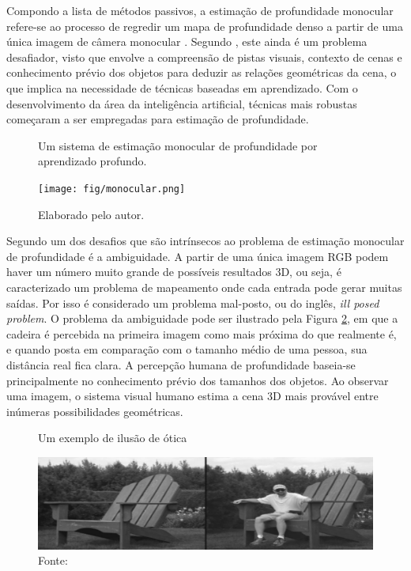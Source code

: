 Compondo a lista de métodos passivos, a estimação de profundidade monocular refere-se ao processo de regredir um mapa de profundidade denso a partir de uma única imagem de câmera monocular \cite{birkl2023midas}. Segundo , este ainda é um problema desafiador, visto que envolve a compreensão de pistas visuais, contexto de cenas e conhecimento prévio dos objetos para deduzir as relações geométricas da cena, o que implica na necessidade de técnicas baseadas em aprendizado. Com o desenvolvimento da área da inteligência artificial, técnicas mais robustas começaram a ser empregadas para estimação de profundidade. 

\begin{figure}[h!]
    \centering
    \caption{Um sistema de estimação monocular de profundidade por aprendizado profundo.}
    \texttt{[image: fig/monocular.png]}
    \caption*{Elaborado pelo autor.}
    \label{fig:monoestim}
\end{figure}

Segundo  um dos desafios que são intrínsecos ao problema de estimação monocular de profundidade é a ambiguidade. A partir de uma única imagem RGB podem haver um número muito grande de possíveis resultados 3D, ou seja, é caracterizado um problema de mapeamento onde cada entrada pode gerar muitas saídas. Por isso é considerado um problema mal-posto, ou do inglês, \textit{ill posed problem}. O problema da ambiguidade pode ser ilustrado pela Figura \ref{fig:ambiguity}, em que a cadeira é percebida na primeira imagem como mais próxima do que realmente é, e quando posta em comparação com o tamanho médio de uma pessoa, sua distância real fica clara. A percepção humana de profundidade baseia-se principalmente no conhecimento prévio dos tamanhos dos objetos. Ao observar uma imagem, o sistema visual humano estima a cena 3D mais provável entre inúmeras possibilidades geométricas. 


\begin{figure}[h!]
    \centering
    \caption{Um exemplo de ilusão de ótica}
    \includegraphics[width=.9\textwidth]{fig/ambiguity.png}
    \caption*{Fonte: }
    \label{fig:ambiguity}
\end{figure}

